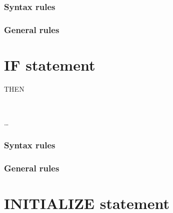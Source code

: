 \begin{syntax}
  \begin{0-1}
    \begin{1=}
       \\
    \end{1=}
    \begin{1=}
      \identifier \\
      \literal
    \end{1=}
  \end{0-1}
\end{syntax}

\subsubsection{Syntax rules}

\subsubsection{General rules}

\section{IF statement}

\begin{syntax}
    THEN
  \begin{1=}
    \imperativestatement \\
     \imperativestatement
  \end{1=} \ldots

  \begin{0-1}
  \end{0-1}
\end{syntax}

\subsubsection{Syntax rules}

\subsubsection{General rules}

\section{INITIALIZE statement}

